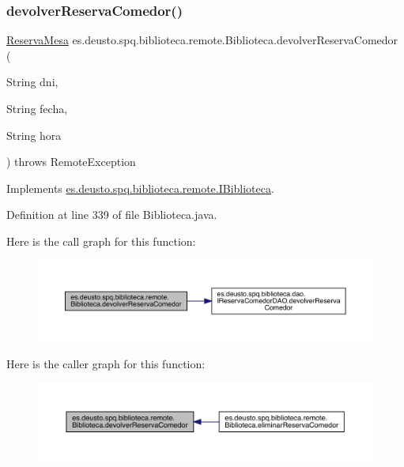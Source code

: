 \subsubsection{\texorpdfstring{devolver\+Reserva\+Comedor()}{devolverReservaComedor()}}
{\footnotesize\ttfamily \mbox{\hyperlink{classes_1_1deusto_1_1spq_1_1biblioteca_1_1data_1_1_reserva_mesa}{Reserva\+Mesa}} es.\+deusto.\+spq.\+biblioteca.\+remote.\+Biblioteca.\+devolver\+Reserva\+Comedor (\begin{DoxyParamCaption}\item[{String}]{dni,  }\item[{String}]{fecha,  }\item[{String}]{hora }\end{DoxyParamCaption}) throws Remote\+Exception}



Implements \mbox{\hyperlink{interfacees_1_1deusto_1_1spq_1_1biblioteca_1_1remote_1_1_i_biblioteca_a06da4875e23b3d05c49695f01e1383df}{es.\+deusto.\+spq.\+biblioteca.\+remote.\+I\+Biblioteca}}.



Definition at line 339 of file Biblioteca.\+java.

Here is the call graph for this function\+:
\nopagebreak
\begin{figure}[H]
\begin{center}
\leavevmode
\includegraphics[width=350pt]{classes_1_1deusto_1_1spq_1_1biblioteca_1_1remote_1_1_biblioteca_a42f0baaeb77d185634a84f10936e8f8e_cgraph}
\end{center}
\end{figure}
Here is the caller graph for this function\+:
\nopagebreak
\begin{figure}[H]
\begin{center}
\leavevmode
\includegraphics[width=350pt]{classes_1_1deusto_1_1spq_1_1biblioteca_1_1remote_1_1_biblioteca_a42f0baaeb77d185634a84f10936e8f8e_icgraph}
\end{center}
\end{figure}
\mbox{\label{classes_1_1deusto_1_1spq_1_1biblioteca_1_1remote_1_1_biblioteca_a33f2a58e9d6cea4181608d233bfcb158}} 
